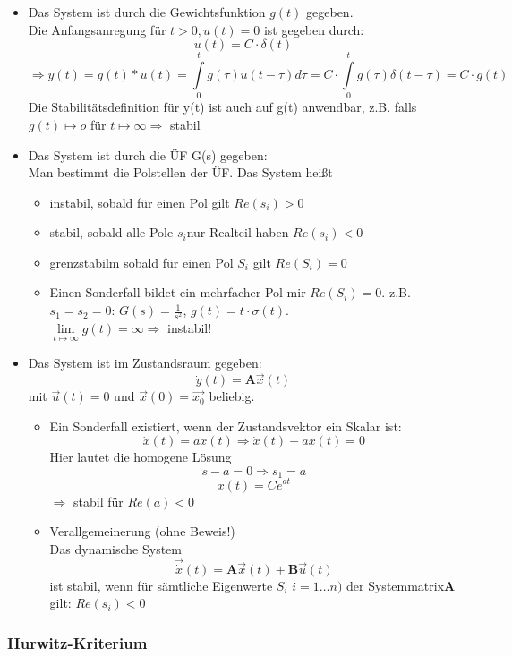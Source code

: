 \documentclass[12pt,a4paper,ngerman]{scrartcl}
\begin{document}
\begin{itemize}
\item Das System ist durch die Gewichtsfunktion $g(t)$ gegeben.\\
 Die Anfangsanregung für $t>0, u(t)=0$ ist gegeben durch:
\[u(t)=C\cdot \delta (t) \]
\[
\Rightarrow y(t)=g(t)*u(t)=\int\limits_0^t{g(\tau)u(t-\tau)d\tau}= C\cdot \int\limits_0^t{g(\tau)\delta(t-\tau)}=C\cdot g(t)
\]
Die Stabilitätsdefinition für y(t) ist auch auf g(t) anwendbar, z.B. falls $g(t)\mapsto o$ für $t\mapsto \infty \Rightarrow$ stabil
\item Das System ist durch die ÜF G(s) gegeben:\\

Man bestimmt die Polstellen der ÜF. Das System heißt
\begin{itemize}
\item instabil, sobald für einen Pol gilt $Re(s_i)>0$
\item stabil, sobald alle Pole $s_i$nur Realteil haben $Re(s_i)<0$
\item grenzstabilm sobald für einen Pol $S_i$ gilt $Re(S_i)=0$
\item Einen Sonderfall bildet ein mehrfacher Pol mir $Re(S_i)=0$. z.B. $s_1=s_2=0$:
$G(s)=\frac{1}{s^2}$, $g(t)=t\cdot \sigma(t)$.\\
$\lim\limits_{t\mapsto \infty}{g(t)=\infty} \Rightarrow$ instabil! 
\end{itemize}
\item Das System ist im  Zustandsraum gegeben:
\[
\dot{y}(t)=\mathbf{A}\vec{x}(t)
\]
mit $\vec{u}(t)=0$ und $\vec{x}(0)=\vec{x_0}$ beliebig.
\begin{itemize}
\item Ein Sonderfall existiert, wenn der Zustandsvektor ein Skalar ist:
\[
\dot{x}(t)=ax(t)\Rightarrow \dot{x}(t)-ax(t)=0
\]
Hier lautet die homogene Lösung
\[
s-a=0 \Rightarrow s_1=a
\]
\[
x(t)=Ce^{at}
\]
$\Rightarrow$ stabil für $Re(a)<0$
\item Verallgemeinerung (ohne Beweis!)\\
Das dynamische System 
\[
\vec{\dot{x}}(t)=\mathbf{A}\vec{x}(t)+\mathbf{B}\vec{u}(t)
\] 
ist stabil, wenn für sämtliche Eigenwerte $S_i$ $i=1\dots n)$ der Systemmatrix$\mathbf{A}$ gilt: $Re(s_i)<0$
\end{itemize}
\end{itemize}

\subsubsection{Hurwitz-Kriterium}
\end{document}
